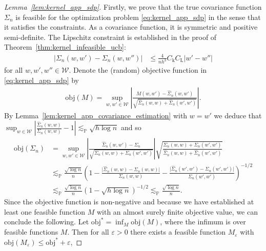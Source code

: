 \documentclass[11pt,lof]{puthesis}
\renewcommand{\P}{\ensuremath{\mathbb{P}}}
\newcommand{\rL}{\ensuremath{\mathrm{L}}}
\newcommand{\rk}{\ensuremath{\mathrm{k}}}
\newcommand{\cW}{\ensuremath{\mathcal{W}}}
\newcommand{\objective}{\ensuremath{\mathrm{obj}}}
\theoremstyle{break}
\theoremstyle{proof}
\newtheorem{proof}{Proof}
\begin{document}
\begin{proof}[Lemma~\ref{lem:kernel_app_sdp}]

  Firstly, we prove that the true covariance function
  $\Sigma_n$
  is feasible for the optimization problem
  \eqref{eq:kernel_app_sdp} in the sense that it satisfies the constraints.
  As a covariance function, it is symmetric and positive semi-definite.
  The Lipschitz constraint is established in the proof of
  Theorem~\ref{thm:kernel_infeasible_ucb}:
  \begin{align*}
    \big| \Sigma_n(w,w') - \Sigma_n(w, w'') \big|
    &\leq
    \frac{4}{n h^3}
    C_\rk
    C_\rL
    |w'-w''|
  \end{align*}
  for all $w,w',w'' \in \cW$.
  Denote the (random) objective function
  in \eqref{eq:kernel_app_sdp} by
  \begin{align*}
    \objective(M) = \sup_{w,w' \in \cW}
    \left|
    \frac{M(w,w') - \hat\Sigma_n(w,w')}
    {\sqrt{\hat \Sigma_n(w,w) + \hat \Sigma_n(w',w')}}
    \right|.
  \end{align*}
  By Lemma~\ref{lem:kernel_app_covariance_estimation}
  with $w = w'$ we deduce that
  $\sup_{w \in \cW}
  \left|\frac{\hat \Sigma_n(w,w)}{\Sigma_n(w,w)} - 1\right|
  \lesssim_\P \sqrt{h \log n}$
  and so
  \begin{align*}
    \objective(\Sigma_n)
    &= \sup_{w,w' \in \cW}
    \left|
    \frac{\hat\Sigma_n(w,w') - \Sigma_n}
    {\sqrt{\Sigma_n(w,w) + \Sigma_n(w',w')}}
    \right|
    \sqrt{\frac{\Sigma_n(w,w) + \Sigma_n(w',w')}
    {\hat \Sigma_n(w,w) + \hat \Sigma_n(w',w')}} \\
    &\lesssim_\P
    \frac{\sqrt{\log n}}{n}
    \left(
      1 - \frac{\big|\hat \Sigma_n(w,w) - \Sigma_n(w,w)\big|}
      {\Sigma_n(w,w)}
      - \frac{\big|\hat \Sigma_n(w',w') - \Sigma_n(w',w')\big|}
      {\Sigma_n(w',w')}
    \right)^{-1/2} \\
    &\lesssim_\P
    \frac{\sqrt{\log n}}{n}
    \left(
      1 - \sqrt{h \log n}
    \right)^{-1/2}
    \lesssim_\P
    \frac{\sqrt{\log n}}{n}.
  \end{align*}
  Since the objective function
  is non-negative and because we have established
  at least one feasible function $M$ with
  an almost surely finite objective value,
  we can conclude the following.
  Let $\objective^* = \inf_M \objective(M)$,
  where the infimum is over feasible functions $M$.
  Then for all $\varepsilon > 0$
  there exists a feasible function $M_\varepsilon$ with
  $\objective(M_\varepsilon) \leq \objective^* + \varepsilon$,

\end{proof}
\end{document}
